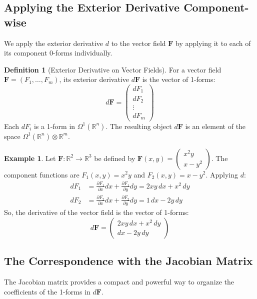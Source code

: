 \documentclass[12pt, letterpaper]{article}
\theoremstyle{definition}
\newtheorem{defn}{Definition}[section]
\newtheorem{exmp}{Example}[section]
\begin{document}
	\subsection{Applying the Exterior Derivative Component-wise}
	We apply the exterior derivative $d$ to the vector field $\mathbf{F}$ by applying it to each of its component 0-forms individually.
	
	\begin{defn}[Exterior Derivative on Vector Fields]
		For a vector field $\mathbf{F} = (F_1, \dots, F_m)$, its exterior derivative $d\mathbf{F}$ is the vector of 1-forms:
		\begin{equation*}
			d\mathbf{F} = \begin{pmatrix} dF_1 \\ dF_2 \\ \vdots \\ dF_m \end{pmatrix}
		\end{equation*}
		Each $dF_i$ is a 1-form in $\Omega^1(\mathbb{R}^n)$. The resulting object $d\mathbf{F}$ is an element of the space $\Omega^1(\mathbb{R}^n) \otimes \mathbb{R}^m$.
	\end{defn}
	
	\begin{exmp}
		Let $\mathbf{F}: \mathbb{R}^2 \to \mathbb{R}^3$ be defined by $\mathbf{F}(x,y) = \begin{pmatrix} x^2y \\ x-y^2 \end{pmatrix}$.
		The component functions are $F_1(x,y) = x^2y$ and $F_2(x,y) = x-y^2$. Applying $d$:
		\begin{align*}
			dF_1 &= \frac{\partial F_1}{\partial x} dx + \frac{\partial F_1}{\partial y} dy = 2xy \, dx + x^2 \, dy \\
			dF_2 &= \frac{\partial F_2}{\partial x} dx + \frac{\partial F_2}{\partial y} dy = 1 \, dx - 2y \, dy
		\end{align*}
		So, the derivative of the vector field is the vector of 1-forms:
		\begin{equation*}
			d\mathbf{F} = \begin{pmatrix} 2xy \, dx + x^2 \, dy \\ dx - 2y \, dy \end{pmatrix}
		\end{equation*}
	\end{exmp}
	
	\subsection{The Correspondence with the Jacobian Matrix}
	The Jacobian matrix provides a compact and powerful way to organize the coefficients of the 1-forms in $d\mathbf{F}$.
	
\end{document}
